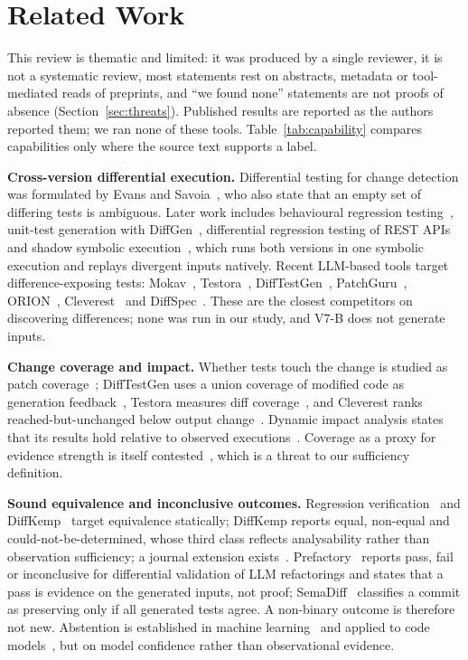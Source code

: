 \section{Related Work}\label{sec:related}
This review is thematic and limited: it was produced by a single reviewer, it is not a systematic review, most statements rest on abstracts, metadata or tool-mediated reads of preprints, and ``we found none'' statements are not proofs of absence (Section~\ref{sec:threats}). Published results are reported as the authors reported them; we ran none of these tools. Table~\ref{tab:capability} compares capabilities only where the source text supports a label.

\textbf{Cross-version differential execution.} Differential testing for change detection was formulated by Evans and Savoia~\cite{evans2007}, who also state that an empty set of differing tests is ambiguous. Later work includes behavioural regression testing~\cite{jin2010automated}, unit-test generation with DiffGen~\cite{taneja2008diffgen}, differential regression testing of REST APIs~\cite{godefroid2020differential} and shadow symbolic execution~\cite{palikareva2016,kuchta2018}, which runs both versions in one symbolic execution and replays divergent inputs natively. Recent LLM-based tools target difference-exposing tests: Mokav~\cite{etemadi2024mokav}, Testora~\cite{pradel2025testora}, DiffTestGen~\cite{hu2026difftestgen}, PatchGuru~\cite{leCong2026patchguru}, ORION~\cite{fu2026orion}, Cleverest~\cite{liu2025evaluating} and DiffSpec~\cite{rao2024diffspec}. These are the closest competitors on discovering differences; none was run in our study, and V7-B does not generate inputs.

\textbf{Change coverage and impact.} Whether tests touch the change is studied as patch coverage~\cite{hilton2018a}; DiffTestGen uses a union coverage of modified code as generation feedback~\cite{hu2026difftestgen}, Testora measures diff coverage~\cite{pradel2025testora}, and Cleverest ranks reached-but-unchanged below output change~\cite{liu2025evaluating}. Dynamic impact analysis states that its results hold relative to observed executions~\cite{law2003,orso2003}. Coverage as a proxy for evidence strength is itself contested~\cite{inozemtseva2014coverage,just2014mut}, which is a threat to our sufficiency definition.

\textbf{Sound equivalence and inconclusive outcomes.} Regression verification~\cite{godlin2009,felsing2014} and DiffKemp~\cite{malik2021} target equivalence statically; DiffKemp reports equal, non-equal and could-not-be-determined, whose third class reflects analysability rather than observation sufficiency; a journal extension exists~\cite{malik2026diffkemp}. Prefactory~\cite{bouzenia2026prefactory} reports pass, fail or inconclusive for differential validation of LLM refactorings and states that a pass is evidence on the generated inputs, not proof; SemaDiff~\cite{ayub2026semadiff} classifies a commit as preserving only if all generated tests agree. A non-binary outcome is therefore not new. Abstention is established in machine learning~\cite{chow1970on,geifman2017,hendrickx2024machine} and applied to code models~\cite{spiess2025calibration}, but on model confidence rather than observational evidence.

